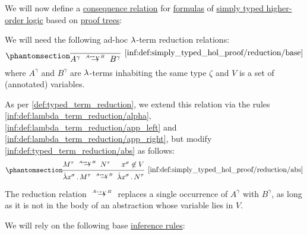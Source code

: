 \begin{definition}\label{def:simply_typed_hol_proof_tree}\mimprovised
  We will now define a \hyperref[def:consequence_relation]{consequence relation} for \hyperref[def:simply_typed_hol_formula]{formulas} of \hyperref[def:simply_typed_hol]{simply typed higher-order logic} based on \hyperref[def:proof_tree]{proof trees}:

  \begin{thmenum}[series=def:simply_typed_hol_proof_tree]
     We will need the following ad-hoc \( {\mathrm \lambda} \)-term reduction relations:
    \begin{equation*}\taglabel[\ensuremath{ \logic{Red}_{A \mapsto_V B} }]{inf:def:simply_typed_hol_proof/reduction/base}
      \begin{prooftree}
        \infer0[\ref{inf:def:simply_typed_hol_proof/reduction/base}]{ A^\gamma \redrel{A \mapsto_V B} B^\gamma },
      \end{prooftree}
    \end{equation*}
    where \( A^\gamma \) and \( B^\gamma \) are \( {\mathrm \lambda} \)-terms inhabiting the same type \( \zeta \) and \( V \) is a set of (annotated) variables.

    As per \cref{def:typed_term_reduction}, we extend this relation via the rules \ref{inf:def:lambda_term_reduction/alpha}, \ref{inf:def:lambda_term_reduction/app_left} and \ref{inf:def:lambda_term_reduction/app_right}, but modify \ref{inf:def:typed_term_reduction/abs} as follows:
    \begin{equation*}\taglabel[\ensuremath{ \logic{Abs}_{A \mapsto_V B} }]{inf:def:simply_typed_hol_proof/reduction/abs}
      \begin{prooftree}
        \hypo{ M^\tau \redrel{A \mapsto_V B} N^\tau }
        \hypo{ x^\sigma \not\in V }
        \infer2[\ref{inf:def:simply_typed_hol_proof/reduction/abs}]{ \qabs {x^\sigma} M^\tau \redrel{A \mapsto_V B} \qabs {x^\sigma} N^\tau }.
      \end{prooftree}
    \end{equation*}

    The reduction relation \( {\redrel{A \mapsto_V B}} \) replaces a single occurrence of \( A^\gamma \) with \( B^\gamma \), as long as it is not in the body of an abstraction whose variable lies in \( V \).

     We will rely on the following base \hyperref[def:inference_rule]{inference rules}:


\end{thmenum}
\end{definition}

